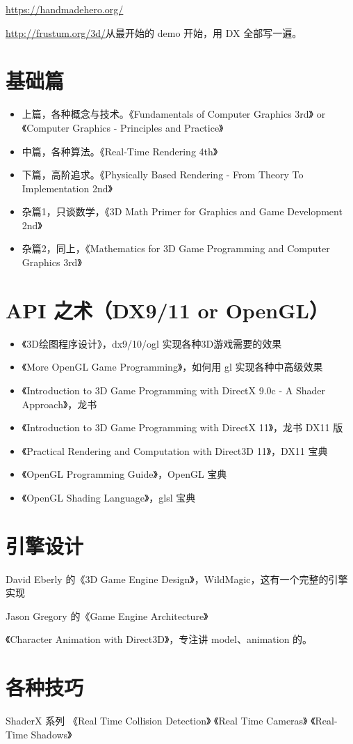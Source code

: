 \documentclass[UTF8,a4paper,12pt]{ctexbook}
\begin{document}
		\url{https://handmadehero.org/}
		
		\url{http://frustum.org/3d/}从最开始的 demo 开始，用 DX 全部写一遍。
	
	\section{基础篇}
		\begin{itemize}
			\item 上篇，各种概念与技术。《Fundamentals of Computer Graphics 3rd》 or 《Computer Graphics - Principles and Practice》
			\item 中篇，各种算法。《Real-Time Rendering 4th》
			\item 下篇，高阶追求。《Physically Based Rendering - From Theory To Implementation 2nd》
			\item 杂篇1，只谈数学，《3D Math Primer for Graphics and Game Development 2nd》
			\item 杂篇2，同上，《Mathematics for 3D Game Programming and Computer Graphics 3rd》
		\end{itemize}
		
	\section{API 之术（DX9/11 or OpenGL）}
		\begin{itemize}
			\item 《3D绘图程序设计》，dx9/10/ogl 实现各种3D游戏需要的效果
			\item 《More OpenGL Game Programming》，如何用 gl 实现各种中高级效果
			\item 《Introduction to 3D Game Programming with DirectX 9.0c - A Shader Approach》，龙书
			\item 《Introduction to 3D Game Programming with DirectX 11》，龙书 DX11 版
			\item 《Practical Rendering and Computation with Direct3D 11》，DX11 宝典
			\item 《OpenGL Programming Guide》，OpenGL 宝典		
			\item 《OpenGL Shading Language》，glsl 宝典			
		\end{itemize}
	
	\section{引擎设计}		
		David Eberly 的《3D Game Engine Design》，WildMagic，这有一个完整的引擎实现
		
		Jason Gregory 的《Game Engine Architecture》
		
		《Character Animation with Direct3D》，专注讲 model、animation 的。
		
	\section{各种技巧}
		ShaderX 系列
		《Real Time Collision Detection》
		《Real Time Cameras》
		《Real-Time Shadows》

	  
\end{document}
